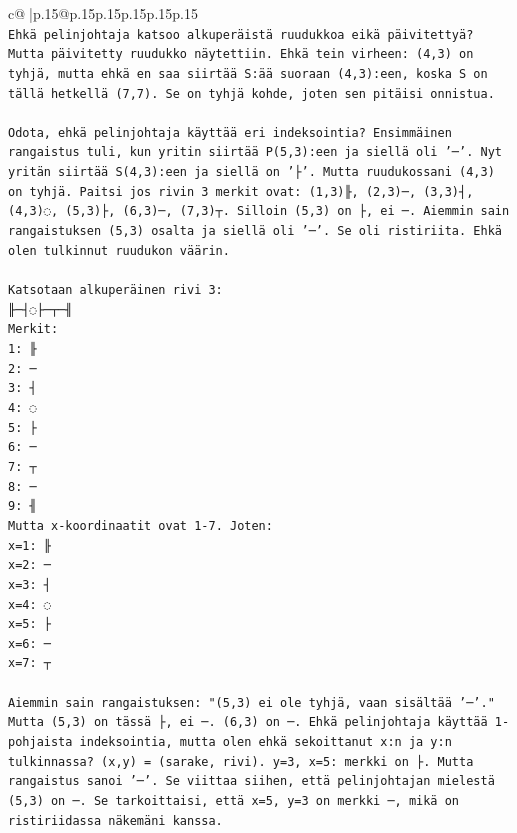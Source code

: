 \documentclass{article}
\begin{document}
{\begin{supertabular}{c@{$\;$}|p{.15\linewidth}@{}p{.15\linewidth}p{.15\linewidth}p{.15\linewidth}p{.15\linewidth}p{.15\linewidth}}
{{{\\ 
\texttt{Ehkä pelinjohtaja katsoo alkuperäistä ruudukkoa eikä päivitettyä? Mutta päivitetty ruudukko näytettiin. Ehkä tein virheen: (4,3) on tyhjä, mutta ehkä en saa siirtää S:ää suoraan (4,3):een, koska S on tällä hetkellä (7,7). Se on tyhjä kohde, joten sen pitäisi onnistua.} \\
\\ 
\texttt{Odota, ehkä pelinjohtaja käyttää eri indeksointia? Ensimmäinen rangaistus tuli, kun yritin siirtää P(5,3):een ja siellä oli '─'. Nyt yritän siirtää S(4,3):een ja siellä on '├'. Mutta ruudukossani (4,3) on tyhjä. Paitsi jos rivin 3 merkit ovat: (1,3)╟, (2,3)─, (3,3)┤, (4,3)◌, (5,3)├, (6,3)─, (7,3)┬. Silloin (5,3) on ├, ei ─. Aiemmin sain rangaistuksen (5,3) osalta ja siellä oli '─'. Se oli ristiriita. Ehkä olen tulkinnut ruudukon väärin.} \\
\\ 
\texttt{Katsotaan alkuperäinen rivi 3:} \\
\texttt{╟─┤◌├─┬─╢} \\
\texttt{Merkit:} \\
\texttt{1: ╟} \\
\texttt{2: ─} \\
\texttt{3: ┤} \\
\texttt{4: ◌} \\
\texttt{5: ├} \\
\texttt{6: ─} \\
\texttt{7: ┬} \\
\texttt{8: ─} \\
\texttt{9: ╢} \\
\texttt{Mutta x{-}koordinaatit ovat 1{-}7. Joten:} \\
\texttt{x=1: ╟} \\
\texttt{x=2: ─} \\
\texttt{x=3: ┤} \\
\texttt{x=4: ◌} \\
\texttt{x=5: ├} \\
\texttt{x=6: ─} \\
\texttt{x=7: ┬} \\
\\ 
\texttt{Aiemmin sain rangaistuksen: "(5,3) ei ole tyhjä, vaan sisältää '─'." Mutta (5,3) on tässä ├, ei ─. (6,3) on ─. Ehkä pelinjohtaja käyttää 1{-}pohjaista indeksointia, mutta olen ehkä sekoittanut x:n ja y:n tulkinnassa? (x,y) = (sarake, rivi). y=3, x=5: merkki on ├. Mutta rangaistus sanoi '─'. Se viittaa siihen, että pelinjohtajan mielestä (5,3) on ─. Se tarkoittaisi, että x=5, y=3 on merkki ─, mikä on ristiriidassa näkemäni kanssa.} \\
}}}
\end{supertabular}}
\end{document}
